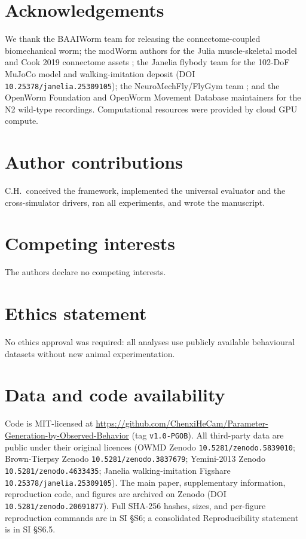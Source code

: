 \documentclass[11pt]{article}
\begin{document}
\section*{Acknowledgements}

We thank the BAAIWorm team \citep{wang2025baaiworm} for releasing the connectome-coupled biomechanical worm; the modWorm authors \citep{shlizerman2025modworm} for the Julia muscle-skeletal model and Cook 2019 connectome assets \citep{cook2019connectome}; the Janelia flybody team \citep{vaxenburg2025flybody} for the 102-DoF MuJoCo model and walking-imitation deposit (DOI \texttt{10.25378/janelia.25309105}); the NeuroMechFly/FlyGym team \citep{wangchen2024neuromechfly}; and the OpenWorm Foundation and OpenWorm Movement Database maintainers for the N2 wild-type recordings. Computational resources were provided by cloud GPU compute.

\section*{Author contributions}
C.H.\ conceived the framework, implemented the universal evaluator and the cross-simulator drivers, ran all experiments, and wrote the manuscript.

\section*{Competing interests}
The authors declare no competing interests.

\section*{Ethics statement}
No ethics approval was required: all analyses use publicly available behavioural datasets without new animal experimentation.

\section*{Data and code availability}
Code is MIT-licensed at \url{https://github.com/ChenxiHeCam/Parameter-Generation-by-Observed-Behavior} (tag \texttt{v1.0-PGOB}). All third-party data are public under their original licences (OWMD Zenodo \texttt{10.5281/zenodo.5839010}; Brown-Tierpsy Zenodo \texttt{10.5281/zenodo.3837679}; Yemini-2013 Zenodo \texttt{10.5281/zenodo.4633435}; Janelia walking-imitation Figshare \texttt{10.25378/janelia.25309105}). The main paper, supplementary information, reproduction code, and figures are archived on Zenodo (DOI \texttt{10.5281/zenodo.20691877}). Full SHA-256 hashes, sizes, and per-figure reproduction commands are in SI \S S6; a consolidated Reproducibility statement is in SI \S S6.5.



\end{document}
